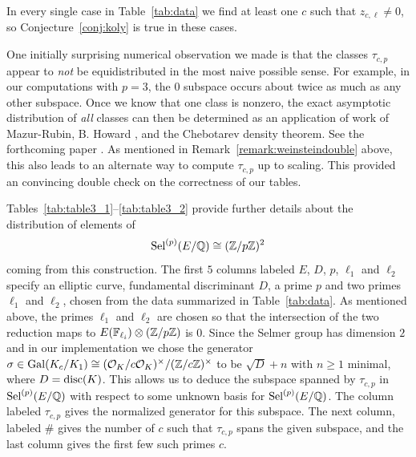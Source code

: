 \documentclass{article} \usepackage[active]{srcltx}
\renewcommand{\O}{\mathcal{O}}
\begin{document}
In every single case in Table~\ref{tab:data} we find at least one $c$
such that $z_{c,\ell}\neq 0$, so Conjecture~\ref{conj:koly} is true in
these cases.


One initially surprising numerical observation we made is that the
classes $\tau_{c,p}$ appear to {\em not} be equidistributed in
the most naive possible sense.  For example, in our computations with
$p=3$, the $0$ subspace occurs about twice as much as any other
subspace.  Once we know that one class is nonzero, the exact
asymptotic distribution of {\em all} classes can then be determined as
an application of work of Mazur-Rubin, B. Howard
\cite{howard:kolyvagin}, and the Chebotarev density theorem. See the
forthcoming paper \cite{stein-weinstein:dist}.  As mentioned in
Remark~\ref{remark:weinsteindouble} above, this also leads to an
alternate way to compute $\tau_{c,p}$ up to scaling.  This provided
an convincing double check on the correctness of our tables.

Tables~\ref{tab:table3_1}--\ref{tab:table3_2} provide further details
about the distribution of elements of $$\operatorname{Sel}^{(p)}(E/\mathbb{Q})\cong
(\mathbb{Z}/p\mathbb{Z})^2$$ coming from this construction.  The first $5$ columns
labeled $E$, $D$, $p$, $\ell_1$ and $\ell_2$ specify an elliptic
curve, fundamental discriminant $D$, a prime $p$ and two primes
$\ell_1$ and $\ell_2$, chosen from the data summarized in
Table~\ref{tab:data}.  As mentioned above, the primes $\ell_1$ and
$\ell_2$ are chosen so that the intersection of the two reduction maps
to $E(\mathbb{F}_{\ell_i})\otimes(\mathbb{Z}/p\mathbb{Z})$ is $0$.  Since the Selmer group has
dimension $2$ and in our implementation we chose the generator
$\sigma\in\Gal(K_c/K_1)\isom (\O_K/c\O_K)^{\times}/(\Z/c\Z)^{\times}$
to be $\sqrt{D}+n$ with $n\geq 1$ minimal, where $D=\operatorname{disc}(K)$.  This
allows us to deduce the subspace spanned by $\tau_{c,p}$ in
$\operatorname{Sel}^{(p)}(E/\mathbb{Q})$ with respect to some unknown basis for
$\operatorname{Sel}^{(p)}(E/\mathbb{Q})$. The column labeled $\tau_{c,p}$ gives the
normalized generator for this subspace.  The next column, labeled $\#$
gives the number of $c$ such that $\tau_{c,p}$ spans the given
subspace, and the last column gives the first few such primes $c$.




\begin{table}[H]
\begin{center}
\caption{Data about $z_{c,\sigma,\ell}$.\label{tab:data}}
\small

\end{center}
\end{table}
\end{document}
